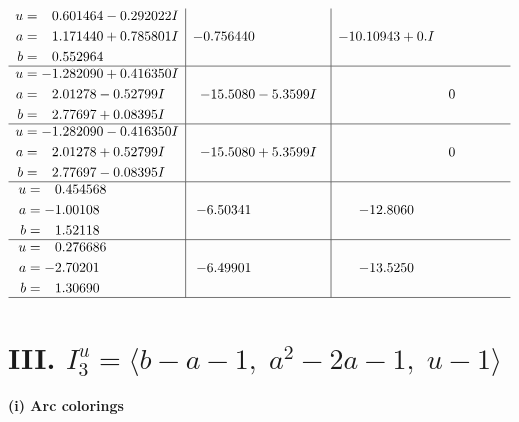 \documentclass[1p]{elsarticle_modified}
\theoremstyle{definition}
\begin{document}
$$\begin{array}{c|c|c}
\begin{aligned}
u &= \phantom{-}0.601464 - 0.292022 I \\
a &= \phantom{-}1.171440 + 0.785801 I \\
b &= \phantom{-}0.552964\phantom{ +0.000000I}\end{aligned}
 & -0.756440\phantom{ +0.000000I} & -10.10943 + 0. I\phantom{ +0.000000I} \\ \hline\begin{aligned}
u &= -1.282090 + 0.416350 I \\
a &= \phantom{-}2.01278 - 0.52799 I \\
b &= \phantom{-}2.77697 + 0.08395 I\end{aligned}
 & -15.5080 - 5.3599 I & \phantom{-0.000000 } 0 \\ \hline\begin{aligned}
u &= -1.282090 - 0.416350 I \\
a &= \phantom{-}2.01278 + 0.52799 I \\
b &= \phantom{-}2.77697 - 0.08395 I\end{aligned}
 & -15.5080 + 5.3599 I & \phantom{-0.000000 } 0 \\ \hline\begin{aligned}
u &= \phantom{-}0.454568\phantom{ +0.000000I} \\
a &= -1.00108\phantom{ +0.000000I} \\
b &= \phantom{-}1.52118\phantom{ +0.000000I}\end{aligned}
 & -6.50341\phantom{ +0.000000I} & -12.8060\phantom{ +0.000000I} \\ \hline\begin{aligned}
u &= \phantom{-}0.276686\phantom{ +0.000000I} \\
a &= -2.70201\phantom{ +0.000000I} \\
b &= \phantom{-}1.30690\phantom{ +0.000000I}\end{aligned}
 & -6.49901\phantom{ +0.000000I} & -13.5250\phantom{ +0.000000I}\\
 \hline 
 \end{array}$$\newpage\newpage\renewcommand{\arraystretch}{1}
\centering \section*{III. $I^u_{3}= \langle b- a-1,\;a^2-2 a-1,\;u-1 \rangle$}
\flushleft \textbf{(i) Arc colorings}\\
\end{document}
